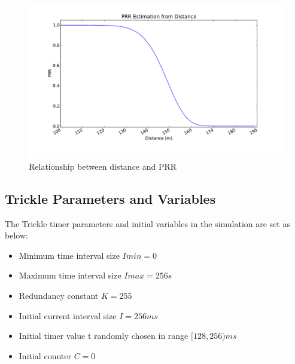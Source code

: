 \begin{figure}[htbp]
  \begin{center}
    \leavevmode
      \includegraphics[scale=0.45]{Pics/prr.pdf}
   \caption{Relationship between distance and PRR}
    \label{fig:prr}
  \end{center}
\end{figure}

\subsection{Trickle Parameters and Variables}
\label{trickle parameters}
The Trickle timer parameters and initial variables in the simulation are set as below:
\begin{itemize}
\item Minimum time interval size $Imin = 0$

\item Maximum time interval size $Imax = 256 s$

\item Redundancy constant $K = 255$

\item Initial current interval size $I = 256 ms$

\item Initial timer value t randomly chosen in range $[128, 256) ms$

\item Initial counter $C = 0$
\end{itemize}

